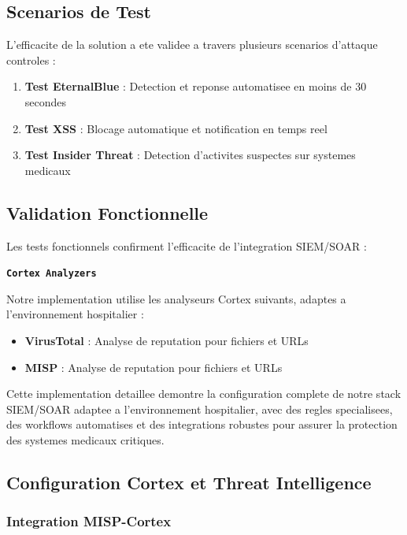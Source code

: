 \subsection{Scenarios de Test}

L'efficacite de la solution a ete validee a travers plusieurs scenarios d'attaque controles :

\begin{enumerate}
    \item \textbf{Test EternalBlue} : Detection et reponse automatisee en moins de 30 secondes
    \item \textbf{Test XSS} : Blocage automatique et notification en temps reel
    \item \textbf{Test Insider Threat} : Detection d'activites suspectes sur systemes medicaux
\end{enumerate}

\subsection{Validation Fonctionnelle}

Les tests fonctionnels confirment l'efficacite de l'integration SIEM/SOAR :

\texttt{\textbf{Cortex Analyzers}}

Notre implementation utilise les analyseurs Cortex suivants, adaptes a l'environnement hospitalier :

\begin{itemize}
    \item \textbf{VirusTotal} : Analyse de reputation pour fichiers et URLs
    \item \textbf{MISP} : Analyse de reputation pour fichiers et URLs
\end{itemize}

Cette implementation detaillee demontre la configuration complete de notre stack SIEM/SOAR adaptee a l'environnement hospitalier, avec des regles specialisees, des workflows automatises et des integrations robustes pour assurer la protection des systemes medicaux critiques.

\subsection{Configuration Cortex et Threat Intelligence}

\subsubsection{Integration MISP-Cortex}

